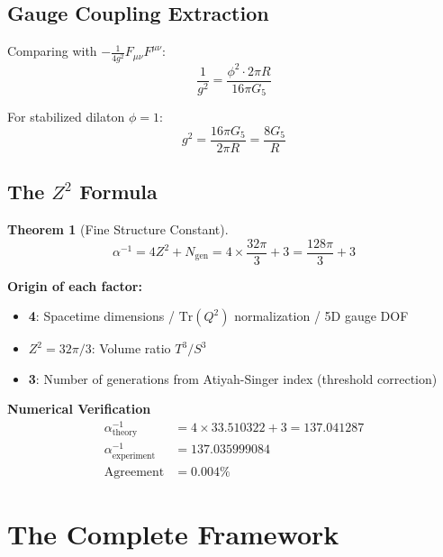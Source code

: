 \documentclass[12pt,a4paper]{article}
\newtheorem{theorem}{Theorem}[section]
\theoremstyle{definition}
\theoremstyle{remark}
\newcommand{\Tr}{\mathrm{Tr}}
\newcommand{\Ngen}{N_{\mathrm{gen}}}
\begin{document}
\subsection{Gauge Coupling Extraction}

Comparing with $-\frac{1}{4g^2}F_{\mu\nu}F^{\mu\nu}$:
\begin{equation}
\frac{1}{g^2} = \frac{\phi^2 \cdot 2\pi R}{16\pi G_5}
\end{equation}

For stabilized dilaton $\phi = 1$:
\begin{equation}
g^2 = \frac{16\pi G_5}{2\pi R} = \frac{8G_5}{R}
\end{equation}

\subsection{The $Z^2$ Formula}

\begin{theorem}[Fine Structure Constant]
\begin{equation}
\boxed{\alpha^{-1} = 4Z^2 + \Ngen = 4 \times \frac{32\pi}{3} + 3 = \frac{128\pi}{3} + 3}
\end{equation}
\end{theorem}

\textbf{Origin of each factor:}
\begin{itemize}
\item \textbf{4}: Spacetime dimensions / $\Tr(Q^2)$ normalization / 5D gauge DOF
\item \textbf{$Z^2 = 32\pi/3$}: Volume ratio $T^3/S^3$
\item \textbf{3}: Number of generations from Atiyah-Singer index (threshold correction)
\end{itemize}

\begin{keyresult}
\textbf{Numerical Verification}
\begin{align}
\alpha^{-1}_{\text{theory}} &= 4 \times 33.510322 + 3 = 137.041287 \\
\alpha^{-1}_{\text{experiment}} &= 137.035999084 \\
\text{Agreement} &= 0.004\%
\end{align}
\end{keyresult}

\section{The Complete Framework}
\label{sec:complete}
\end{document}
